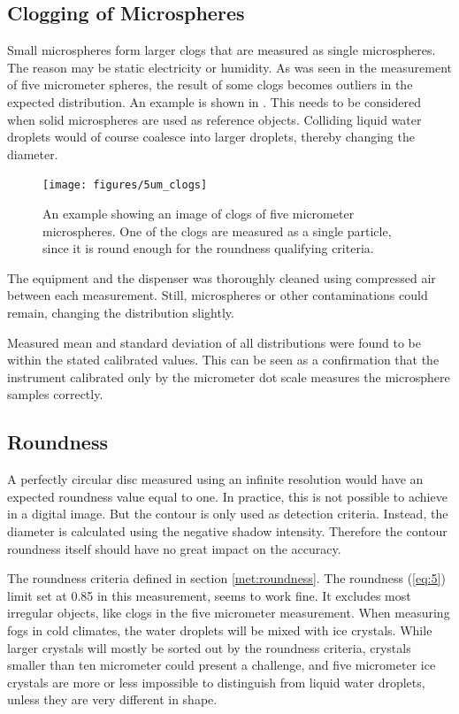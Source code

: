 \subsection{Clogging of Microspheres}

Small microspheres form larger clogs that are measured as single microspheres. The reason may be static electricity or humidity. As was seen in the measurement of five micrometer spheres, the result of some clogs becomes outliers in the expected distribution. An example is shown in . This needs to be considered when solid microspheres are used as reference objects. Colliding liquid water droplets would of course coalesce into larger droplets, thereby changing the diameter.

\begin{figure}[ht]
\centering\texttt{[image: figures/5um\_clogs]}
\caption{An example showing an image of clogs of five micrometer microspheres. One of the clogs are measured as a single particle, since it is round enough for the roundness qualifying criteria.}
\label{fig:5umclog}
\end{figure}

The equipment and the dispenser was thoroughly cleaned using compressed air between each measurement. Still, microspheres or other contaminations could remain, changing the distribution slightly.

Measured mean and standard deviation of all distributions were found to be within the stated calibrated values. This can be seen as a confirmation that the instrument calibrated only by the micrometer dot scale measures the microsphere samples correctly.

\subsection{Roundness}

A perfectly circular disc measured using an infinite resolution would have an expected roundness value equal to one. In practice, this is not possible to achieve in a digital image. But the contour is only used as detection criteria. Instead, the diameter is calculated using the negative shadow intensity. Therefore the contour roundness itself should have no great impact on the accuracy.

The roundness criteria defined in section \ref{met:roundness}. The roundness (\ref{eq:5}) limit set at 0.85 in this measurement, seems to work fine. It excludes most irregular objects, like clogs in the five micrometer measurement. When measuring fogs in cold climates, the water droplets will be mixed with ice crystals. While larger crystals will mostly be sorted out by the roundness criteria, crystals smaller than ten micrometer could present a challenge, and five micrometer ice crystals are more or less impossible to distinguish from liquid water droplets, unless they are very different in shape.

